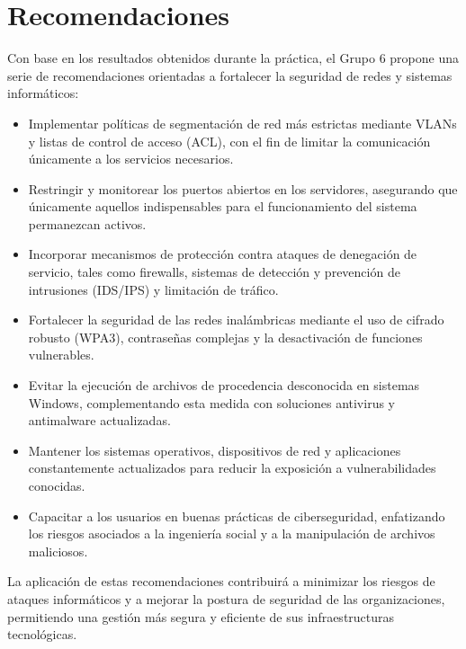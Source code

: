 \section{Recomendaciones}

Con base en los resultados obtenidos durante la práctica, el Grupo 6 propone una serie de recomendaciones orientadas a fortalecer la seguridad de redes y sistemas informáticos:

\begin{itemize}
    \item Implementar políticas de segmentación de red más estrictas mediante VLANs y listas de control de acceso (ACL), con el fin de limitar la comunicación únicamente a los servicios necesarios.
    
    \item Restringir y monitorear los puertos abiertos en los servidores, asegurando que únicamente aquellos indispensables para el funcionamiento del sistema permanezcan activos.
    
    \item Incorporar mecanismos de protección contra ataques de denegación de servicio, tales como firewalls, sistemas de detección y prevención de intrusiones (IDS/IPS) y limitación de tráfico.
    
    \item Fortalecer la seguridad de las redes inalámbricas mediante el uso de cifrado robusto (WPA3), contraseñas complejas y la desactivación de funciones vulnerables.
    
    \item Evitar la ejecución de archivos de procedencia desconocida en sistemas Windows, complementando esta medida con soluciones antivirus y antimalware actualizadas.
    
    \item Mantener los sistemas operativos, dispositivos de red y aplicaciones constantemente actualizados para reducir la exposición a vulnerabilidades conocidas.
    
    \item Capacitar a los usuarios en buenas prácticas de ciberseguridad, enfatizando los riesgos asociados a la ingeniería social y a la manipulación de archivos maliciosos.
\end{itemize}

La aplicación de estas recomendaciones contribuirá a minimizar los riesgos de ataques informáticos y a mejorar la postura de seguridad de las organizaciones, permitiendo una gestión más segura y eficiente de sus infraestructuras tecnológicas.
